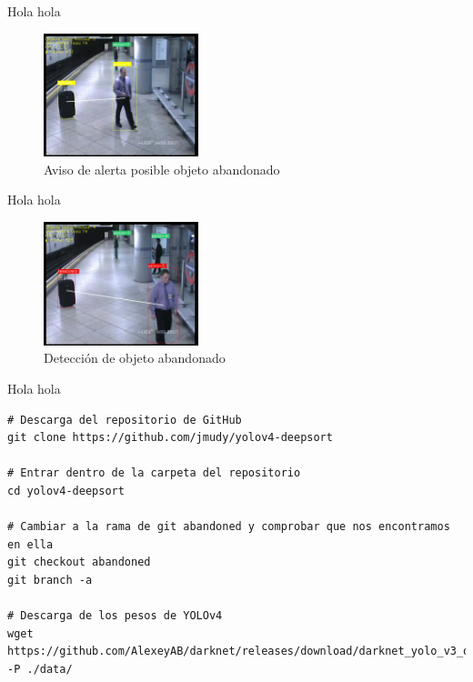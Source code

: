 Hola hola

\begin{figure}[ht]
\centering
\includegraphics[width=0.4\textwidth]{img/chapters/desarrollo/warning-abandono.jpg}
\caption{\label{fig:warning-abandono}Aviso de alerta posible objeto abandonado}
\end{figure}

Hola hola

\begin{figure}[ht]
\centering
\includegraphics[width=0.4\textwidth]{img/chapters/desarrollo/abandono-objeto-avss.jpg}
\caption{\label{fig:abandono-objeto-avss}Detección de objeto abandonado}
\end{figure}

Hola hola

\newpage

\vspace{0.5cm}
\begin{lstlisting}[language=iPython,caption=Evaluación de la detección de objetos abandonados con DeepSORT y YOLOv4 en Tensorflow (1),captionpos=b,label={lst:evaluate-abandoned-object1}]
# Descarga del repositorio de GitHub
git clone https://github.com/jmudy/yolov4-deepsort

# Entrar dentro de la carpeta del repositorio
cd yolov4-deepsort

# Cambiar a la rama de git abandoned y comprobar que nos encontramos en ella
git checkout abandoned
git branch -a

# Descarga de los pesos de YOLOv4
wget https://github.com/AlexeyAB/darknet/releases/download/darknet_yolo_v3_optimal/yolov4.weights -P ./data/
\end{lstlisting}

